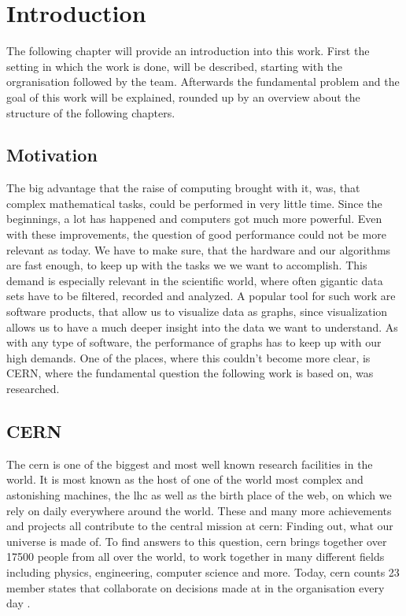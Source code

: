 
\chapter{Introduction}
\label{ch:Introduction}

The following chapter will provide an introduction into this work. First the setting in which the work is done, will be described, starting with the orgranisation followed by the team. Afterwards the fundamental problem and the goal of this work will be explained, rounded up by an overview about the structure of the following chapters.

\section{Motivation}
\label{sec:Introduction:Motivation}

The big advantage that the raise of computing brought with it, was, that complex mathematical tasks, could be performed in very little time. Since the beginnings, a lot has happened and computers got much more powerful. Even with these improvements, the question of good performance could not be more relevant as today. We have to make sure, that the hardware and our algorithms are fast enough, to keep up with the tasks we we want to accomplish. This demand is especially relevant in the scientific world, where often gigantic data sets have to be filtered, recorded and analyzed. A popular tool for such work are software products, that allow us to visualize data as graphs, since visualization allows us to have a much deeper insight into the data we want to understand. As with any type of software, the performance of graphs has to keep up with our high demands. One of the places, where this couldn't become more clear, is CERN, where the fundamental question the following work is based on, was researched.

\section{CERN}
\label{sec:Introduction:CERN}

The \gls{cern} is one of the biggest and most well known research facilities in the world. It is most known as the host of one of the world most complex and astonishing machines, the \gls{lhc} as well as the birth place of the \gls{web}, on which we rely on daily everywhere around the world. \cite{Cern}
These and many more achievements and projects all contribute to the central mission at \gls{cern}: Finding out, what our universe is made of. To find answers to this question, \gls{cern} brings together over 17500 people from all over the world, to work together in many different fields including physics, engineering, computer science and more. Today, \gls{cern} counts 23 member states that collaborate on decisions made at in the organisation every day \cite{CernWhoWeAre}.

